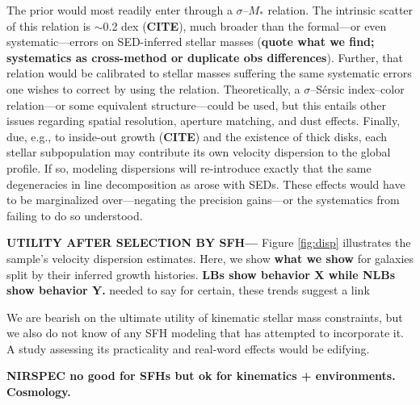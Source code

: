 \documentclass[a4paper,fleqn,usenatbib]{mnras}
\newcommand{\Mstel}{M_\ast}
\newcommand{\bfr}{\bf\color{red}}
\newcommand{\CITE}{{\bfr CITE}}
\begin{document}
The prior would most readily enter through a $\sigma$--$\Mstel$ relation. The intrinsic scatter
of this relation is $\sim$0.2 dex (\CITE), much broader than the formal---or even systematic---errors 
on SED-inferred stellar masses ({\bfr quote what we find; systematics as cross-method or duplicate
obs differences}). Further, that relation would be calibrated to stellar masses suffering the same 
systematic errors one wishes to correct by using the relation. Theoretically, a $\sigma$--S\'{e}rsic 
index--color relation---or some equivalent structure---could be used, but this entails other issues 
regarding spatial resolution, aperture matching, and dust effects. Finally, due, e.g., to inside-out 
growth (\CITE) and the existence of thick disks, each stellar subpopulation may contribute its own velocity 
dispersion to the global profile. If so, modeling dispersions will re-introduce exactly that the same 
degeneracies in line decomposition as arose with SEDs. These 
effects would have to be marginalized over---negating the precision gains---or the systematics from 
failing to do so understood.

{\bfr UTILITY AFTER SELECTION BY SFH---} Figure \ref{fig:disp} illustrates the sample's 
velocity dispersion estimates. Here, we show {\bfr what we show} for galaxies split by their inferred 
growth histories. {\bfr LBs show behavior X while NLBs show behavior Y.} %
needed to say for certain, these trends suggest a link


We are bearish on the ultimate utility of kinematic stellar mass constraints, 
but we also do not know of any SFH modeling that has attempted to incorporate it. A 
study assessing its practicality and real-word effects would be edifying.

{\bfr NIRSPEC no good for SFHs but ok for kinematics + environments. Cosmology.}
\end{document}
